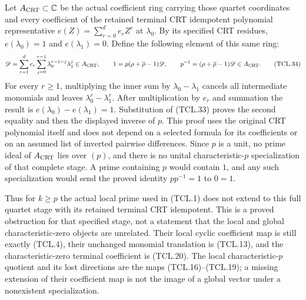 Let \(A_{\rm CRT}\subset\mathbb C\) be the actual coefficient
ring carrying those quartet coordinates and every coefficient of
the retained terminal CRT idempotent polynomial representative
\(e(Z)=\sum_{r=0}^{d}e_rZ^r\) at \(\lambda_0\).
By its specified CRT residues, \(e(\lambda_0)=1\) and
\(e(\lambda_1)=0\). Define the following element of this same ring:
\[
 \mathscr D=\sum_{r=1}^{d}e_r
       \sum_{j=0}^{r-1}\lambda_0^{r-1-j}\lambda_1^j
       \in A_{\rm CRT},\qquad
 1=p(\rho+\overline\rho-1)\mathscr D,
 \qquad
 p^{-1}=(\rho+\overline\rho-1)\mathscr D\in A_{\rm CRT}.
 \tag{TCL.34}\label{eq:tcl-crt-obstruction}
\]
For every \(r\geq1\), multiplying the inner sum by
\(\lambda_0-\lambda_1\) cancels all intermediate monomials
and leaves \(\lambda_0^r-\lambda_1^r\). After multiplication
by \(e_r\) and summation the result is
\(e(\lambda_0)-e(\lambda_1)=1\). Substitution of (TCL.33)
proves the second equality and then the displayed inverse of
\(p\). This proof uses the original CRT polynomial itself and
does not depend on a selected formula for its coefficients or
on an assumed list of inverted pairwise differences.
Since \(p\) is a unit, no prime ideal of \(A_{\rm CRT}\)
lies over \((p)\), and there is no unital characteristic-\(p\)
specialization of that complete stage. A prime containing \(p\)
would contain \(1\), and any such specialization would send the
proved identity \(p p^{-1}=1\) to \(0=1\).

Thus for \(k\geq p\) the actual local prime used in (TCL.1)
does not extend to this full quartet stage with its retained
terminal CRT idempotent. This is a proved obstruction for that
specified stage, not a statement that the local and global
characteristic-zero objects are unrelated. Their local cyclic
coefficient map is still exactly (TCL.4), their unchanged monomial
translation is (TCL.13), and the characteristic-zero terminal
coefficient is (TCL.20). The local characteristic-\(p\) quotient
and its lost directions are the maps (TCL.16)--(TCL.19); a missing
extension of their coefficient map is not the image of a global
vector under a nonexistent specialization.

